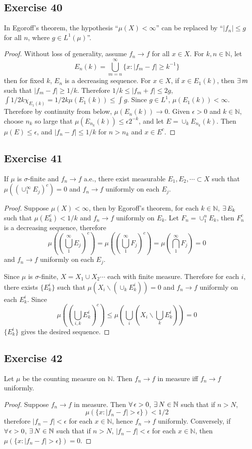 \subsection*{Exercise 40}
In Egoroff's theorem, the hypothesis ``$\mu(X)<\infty$'' can be replaced by ``$|f_n|\le g$ for all $n$, where $g\in L^1(\mu)$''.
\begin{proof}
    Without loss of generality, assume $f_n\to f$ for all $x\in X$. For $k,n\in\mathbb{N}$, let 
    $$
    E_n(k)=\bigcup^\infty_{m=n}\{x:|f_m-f|\ge k^{-1}\}
    $$
    then for fixed $k$, $E_n$ is a decreasing sequence. For $x\in X$, if $x\in E_1(k)$, then $\exists\, m$ such that $|f_m-f|\ge 1/k$. Therefore $1/k\le|f_m+f|\le 2g$, $\int 1/2k\chi_{E_{1}(k)}=1/2k\mu(E_{1}(k))\le\int g$. Since $g\in L^1$, $\mu(E_{1}(k))<\infty$. Therefore by continuity from below, $\mu(E_n(k))\to 0$. Given $\epsilon>0$ and $k\in\mathbb{N}$, choose $n_k$ so large that $\mu(E_{n_k}(k))\le\epsilon 2^{-k}$, and let $E=\cup_kE_{n_k}(k)$. Then $\mu(E)\le\epsilon$, and $|f_n-f|\le 1/k$ for $n>n_k$ and $x\in E^c$.
\end{proof}
\subsection*{Exercise 41}
If $\mu$ is $\sigma$-finite and $f_n\to f$ a.e., there exist measurable $E_1,E_2,\cdots\subset X$ such that $\mu((\cup^\infty_1E_j)^c)=0$ and $f_n\to f$ uniformly on each $E_j$.
\begin{proof}
    Suppose $\mu(X)<\infty$, then by Egoroff's theorem, for each $k\in\mathbb{N}$, $\exists\, E_k$ such that $\mu(E_k^c)<1/k$ and $f_n\to f$ uniformly on $E_k$. Let $F_n=\cup_1^n E_k$, then $F_n^c$ is a decreasing sequence, therefore
    $$
    \mu\left(\left(\bigcup_1^\infty E_j\right)^c\right)=\mu\left(\left(\bigcup_1^\infty F_j\right)^c\right)=\mu\left(\bigcap_1^\infty F_j\right)=0
    $$
    and $f_n\to f$ uniformly on each $E_j$.
    \par Since $\mu$ is $\sigma$-finite, $X=X_1\cup X_2\cdots$ each with finite measure. Therefore for each $i$, there exists $\{E^i_k\}$ such that $\mu(X_i\backslash(\cup_kE^i_k))=0$ and $f_n\to f$ uniformly on each $E^i_k$. Since
    $$
    \mu\left(\left(\bigcup_{i,k}E^i_k\right)^c\right)\le\mu\left(\bigcup_i\left(X_i\backslash\bigcup_kE^i_k\right)\right)=0
    $$
    $\{E^i_k\}$ gives the desired sequence.
\end{proof}
\subsection*{Exercise 42}
Let $\mu$ be the counting measure on $\mathbb{N}$. Then $f_n\to f$ in measure iff $f_n\to f$ uniformly.
\begin{proof}
    Suppose $f_n\to f$ in measure. Then $\forall\,\epsilon>0$, $\exists\, N\in\mathbb{N}$ such that if $n>N$,
    $$
    \mu(\{x:|f_n-f|>\epsilon\})<1/2
    $$
    therefore $|f_n-f|<\epsilon$ for each $x\in\mathbb{N}$, hence $f_n\to f$ uniformly. Conversely, if $\forall\,\epsilon>0$, $\exists\, N\in\mathbb{N}$ such that if $n>N$, $|f_n-f|<\epsilon$ for each $x\in\mathbb{N}$, then $\mu(\{x:|f_n-f|>\epsilon\})=0$.
\end{proof}
